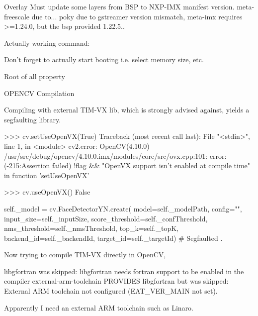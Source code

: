 Overlay
Must update some layers from BSP to NXP-IMX manifest version.
meta-freescale due to...
poky due to gstreamer version mismatch, meta-imx requires >=1.24.0,
but the bsp provided 1.22.5..

Actually working command:

Don't forget to actually start booting i.e. select memory size, etc.


Root of all property 

\sec OPENCV Compilation

Compiling with external TIM-VX lib,
which is strongly advised against,
yields a segfaulting library.

\begtt{}
>>> cv.setUseOpenVX(True)
Traceback (most recent call last):
  File "<stdin>", line 1, in <module>
cv2.error: OpenCV(4.10.0) /usr/src/debug/opencv/4.10.0.imx/modules/core/src/ovx.cpp:101: error: (-215:Assertion failed) !flag && "OpenVX support isn't enabled at compile time" in function 'setUseOpenVX'

>>> cv.useOpenVX()
False

self._model = cv.FaceDetectorYN.create(
            model=self._modelPath,
            config="",
            input_size=self._inputSize,
            score_threshold=self._confThreshold,
            nms_threshold=self._nmsThreshold,
            top_k=self._topK,
            backend_id=self._backendId,
            target_id=self._targetId)
	    # Segfaulted
\endtt
.

Now trying to compile TIM-VX directly in OpenCV,

\begtt
libgfortran was skipped: libgfortran needs fortran support to be enabled in the compiler
external-arm-toolchain PROVIDES libgfortran but was skipped: External ARM toolchain not configured (EAT_VER_MAIN not set).
\endtt

Apparently I need an external ARM toolchain such as Linaro.


